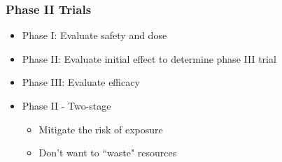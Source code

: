 \documentclass{beamer}\usepackage[]{graphicx}\usepackage[]{color}
\begin{document}
\begin{frame}
\frametitle{Phase II Trials}
    \begin{itemize}
        \item Phase I: Evaluate safety and dose
        \item Phase II: Evaluate initial effect to determine phase III trial
        \item Phase III: Evaluate efficacy  
    \end{itemize}
    \begin{itemize}
        \item Phase II - Two-stage
          \begin{itemize}
            \item Mitigate the risk of exposure
            \item Don't want to ``waste" resources
          \end{itemize}
    \end{itemize}
\end{frame}
\end{document}
